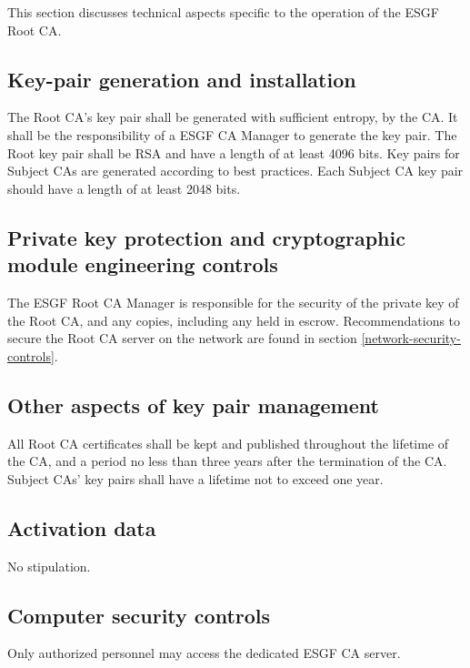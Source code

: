 This section discusses technical aspects specific to the operation of
the ESGF Root CA.

\subsection{Key-pair generation and installation}\label{key-pair-generation-and-installation}

The Root CA's key pair shall be generated with sufficient entropy, by the CA. It shall be the responsibility of a ESGF CA Manager to generate the key pair. The Root key pair shall be RSA and have a length of at least 4096 bits. Key pairs for Subject CAs are
generated according to best practices. Each Subject CA key pair should
have a length of at least 2048 bits.

\subsection{Private key protection and cryptographic module engineering controls}\label{private-key-protection-and-crypto}
The ESGF Root CA Manager is responsible for the security of the private key of the Root CA, and any copies, including any held in escrow. Recommendations to secure the Root CA server on the network are found in section \ref{network-security-controls}.

\subsection{Other aspects of key pair management}\label{other-aspects-of-key-pair-management}

All Root CA certificates shall be kept and published throughout the
lifetime of the CA, and a period no less than three years after the
termination of the CA. Subject CAs' key pairs shall have a lifetime not
to exceed one year.

\subsection{Activation data}\label{activation-data}
No stipulation.

\subsection{Computer security controls}\label{computer-security-controls}

Only authorized personnel may access the dedicated ESGF CA server.

